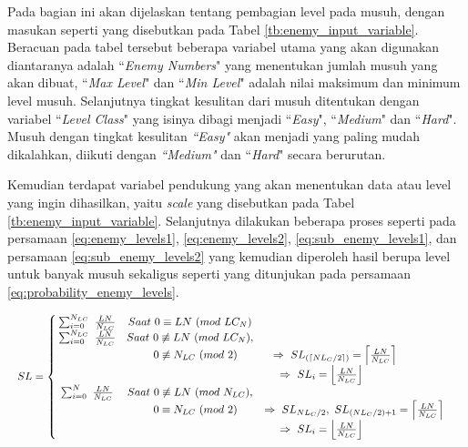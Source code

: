 Pada bagian ini akan dijelaskan tentang pembagian level pada musuh, dengan masukan seperti yang disebutkan pada Tabel \ref{tb:enemy_input_variable}. Beracuan pada tabel tersebut beberapa variabel utama yang akan digunakan diantaranya adalah ``\textit{Enemy Numbers}" yang menentukan jumlah musuh yang akan dibuat, ``\textit{Max Level}" dan ``\textit{Min Level}" adalah nilai maksimum dan minimum level musuh. Selanjutnya tingkat kesulitan dari musuh ditentukan dengan variabel ``\textit{Level Class}" yang isinya dibagi menjadi ``\textit{Easy}", ``\textit{Medium}" dan ``\textit{Hard}". Musuh dengan tingkat kesulitan \textit{``Easy"} akan menjadi yang paling mudah dikalahkan, diikuti dengan \textit{``Medium"} dan ``\textit{Hard}" secara berurutan.
\vspace{1ex}

Kemudian terdapat variabel pendukung yang akan menentukan data atau level yang ingin dihasilkan, yaitu \textit{scale} yang disebutkan pada Tabel \ref{tb:enemy_input_variable}. Selanjutnya dilakukan beberapa proses seperti pada persamaan \ref{eq:enemy_levels1}, \ref{eq:enemy_levels2}, \ref{eq:sub_enemy_levels1}, dan persamaan \ref{eq:sub_enemy_levels2} yang kemudian diperoleh hasil berupa level untuk banyak musuh sekaligus seperti yang ditunjukan pada persamaan \ref{eq:probability_enemy_levels}.
\vspace{1ex}

\begin{equation}\label{eq:enemy_levels1}
	\resizebox{\columnwidth}{!}{%
		$SL = \left\{\begin{matrix}
		\hspace{0.2em} \sum_{i = 0}^{N_{LC}}\ \frac{LN}{N_{LC}} & Saat\ 0 \equiv LN\ (mod\ LC_{N}) & \\
		
		\hspace{0.2em} \sum_{i = 0}^{N_{LC}}\ \frac{LN}{N_{LC}} & Saat\ 0 \not\equiv LN\ (mod\ LC_{N}), & \\
		&\hspace{1.0em}  0 \not\equiv N_{LC}\ (mod\ 2) & \hspace{-3.5em} \Rightarrow\ SL_{(\left \lceil NL_{C}/2 \right \rceil)}  = \left \lceil \frac{LN}{N_{LC}} \right \rceil &\\
		
		& & \hspace{-6.0em} \Rightarrow\ SL_{i}  = \left \lfloor \frac{LN}{N_{LC}} \right \rfloor &\\
		
		\hspace{0.2em} \sum_{i = 0}^{N}\ \frac{LN}{N_{LC}} & Saat\ 0 \not\equiv LN\ (mod\ N_{LC}), & \\
		&\hspace{1.0em}  0 \equiv N_{LC}\ (mod\ 2) & \Rightarrow\ SL_{NL_{C}/2},\ SL_{(NL_{C}/2) + 1}  = \left \lceil \frac{LN}{N_{LC}} \right \rceil &\\
		
		& & \hspace{-6.0em} \Rightarrow\ SL_{i}  = \left \lfloor \frac{LN}{N_{LC}} \right \rfloor &\\
		\end{matrix}\right.$%
	}
\end{equation}

